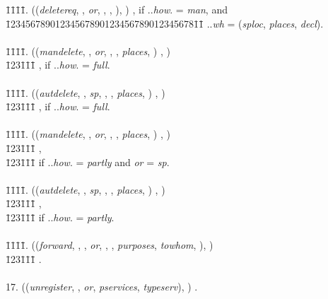 \documentclass[a4paper]{article}
\begin{document}
\begin{tabbing}
\=1\=1\=1\=1\= .	((\textit{deletereq}, , \textit{or}, , , ), )  , if  ..\textit{how}. =  \textit{man}, and\\
	\=12345678901234567890123456789012345678\=1\=1\= \kill
		\>\> 
	 ..\textit{wh} =  (\textit{sploc}, \textit{places}, \textit{decl}).\\\\
\=1\=1\=1\=1\= .	((\textit{mandelete}, , \textit{or}, , ,  \textit{places}, ) , )  
		\\ 
		\=123\=1\=1\=1\= \kill
		\>\>  [(, , )  ], if  ..\textit{how}. =  \textit{full}.  \\\\	
\=1\=1\=1\=1\= .	((\textit{autdelete}, , \textit{sp}, , ,  \textit{places}, ) , ) \\ 
		\=123\=1\=1\=1\= \kill
		\>\> 
		[(, , )  ], if  ..\textit{how}. =  \textit{full}. \\\\
\=1\=1\=1\=1\= .	((\textit{mandelete}, , \textit{or}, , ,  \textit{places}, ) , )  
		\\ 
		\=123\=1\=1\=1\= \kill
		\>, \\ 
		\=123\=1\=1\=1\= \kill
		\>\> if  ..\textit{how}. =  \textit{partly} and \textit{or} = \textit{sp}.  \\\\	
\=1\=1\=1\=1\= .	((\textit{autdelete}, , \textit{sp},  , ,  \textit{places}, ) , ) \\ 
		\=123\=1\=1\=1\= \kill
		\>, \\ 
		\=123\=1\=1\=1\= \kill
		\>\> if  ..\textit{how}. =  \textit{partly}.  \\\\ 
\=1\=1\=1\=1\= . ((\textit{forward}, , , \textit{or}, , ,   \textit{purposes}, \textit{towhom}, ), )\\ 
		\=123\=1\=1\=1\= \kill
		\>.\\\\ 
17. ((\textit{unregister}, , \textit{or}, \textit{pservices}, \textit{typeserv}), )  .
\end{tabbing}
\end{document}
